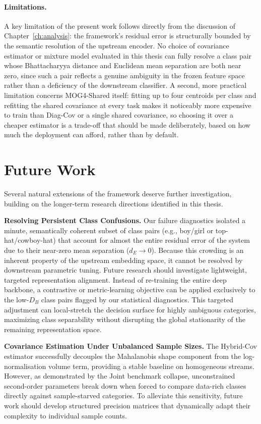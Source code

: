 \paragraph{Limitations.} A key limitation of the present work follows directly from the discussion of Chapter~\ref{ch:analysis}: the framework's residual error is structurally bounded by the semantic resolution of the upstream encoder. No choice of covariance estimator or mixture model evaluated in this thesis can fully resolve a class pair whose Bhattacharyya distance and Euclidean mean separation are both near zero, since such a pair reflects a genuine ambiguity in the frozen feature space rather than a deficiency of the downstream classifier. A second, more practical limitation concerns MOG4-Shared itself: fitting up to four centroids per class and refitting the shared covariance at every task makes it noticeably more expensive to train than Diag-Cov or a single shared covariance, so choosing it over a cheaper estimator is a trade-off that should be made deliberately, based on how much the deployment can afford, rather than by default.

\section{Future Work}

Several natural extensions of the framework deserve further investigation, building on the longer-term research directions identified in this thesis.

\textbf{Resolving Persistent Class Confusions.}
Our failure diagnostics isolated a minute, semantically coherent subset of class pairs (e.g., boy/girl or top-hat/cowboy-hat) that account for almost the entire residual error of the system due to their near-zero mean separation ($d_E \to 0$). Because this crowding is an inherent property of the upstream embedding space, it cannot be resolved by downstream parametric tuning. Future research should investigate lightweight, targeted representation alignment. Instead of re-training the entire deep backbone, a contrastive or metric-learning objective can be applied exclusively to the low-$D_B$ class pairs flagged by our statistical diagnostics. This targeted adjustment can local-stretch the decision surface for highly ambiguous categories, maximizing class separability without disrupting the global stationarity of the remaining representation space.

\textbf{Covariance Estimation Under Unbalanced Sample Sizes.}
The Hybrid-Cov estimator successfully decouples the Mahalanobis shape component from the log-normalisation volume term, providing a stable baseline on homogeneous streams. However, as demonstrated by the Joint benchmark collapse, unconstrained second-order parameters break down when forced to compare data-rich classes directly against sample-starved categories. To alleviate this sensitivity, future work should develop structured precision matrices that dynamically adapt their complexity to individual sample counts.

